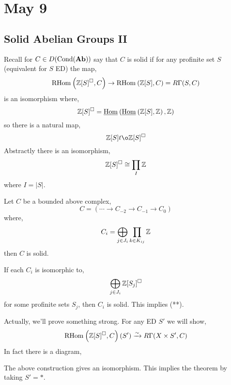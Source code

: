 \documentclass[12pt]{article}
\newcommand{\Cond}{\mathrm{Cond}}
\newcommand{\sol}{\square}
\begin{document}
\section{May 9}

\subsection{Solid Abelian Groups II}

Recall for $C \in D(\Cond(\Ab))$ say that $C$ is solid if for any profinite set $S$ (equivalent for $S$ ED) the map,
\[ \RHom{}{\Z[S]^{\sol}}{C} \to \RHom{}{\Z[S]}{C} = R \Gamma(S, C) \]
is an isomorphism where,
\[ \Z[S]^{\sol} = \uHom{}{\uHom{}{\Z[S]}{\Z}}{\Z} \]
so there is a natural map,
\[ \Z[S] t\o \Z[S]^{\sol} \]
Abstractly there is an isomorphism,
\[ \Z[S]^{\sol} \cong \prod_I \Z \]
where $I = |S|$.

\begin{theorem}
Let $C$ be a bounded above complex,
\[ C = ( \cdots \to C_{-2} \to C_{-1} \to C_0 ) \]
where,
\[ C_i = \bigoplus_{j \in J_i} \prod_{k \in K_{ij}} \mathbb{Z} \]
then $C$ is solid.
\end{theorem}

\begin{example}
If each $C_i$ is isomorphic to,
\[ \bigoplus_{j \in J_i} \Z[S_j]^{\sol} \]
for some profinite sets $S_j$, then $C_i$ is solid. This implies (**).
\end{example}

\begin{rmk}
Actually, we'll prove something strong. For any ED $S'$ we will show,
\[ \RHom{}{\Z[S]^{\sol}}{C}(S') \iso R\Gamma(X \times S', C) \]
In fact there is a diagram,
\begin{center}
\end{center}
\end{rmk}

\begin{prop}
The above construction gives an isomorphism. This implies the theorem by taking $S' = *$.
\end{prop}
\end{document}
